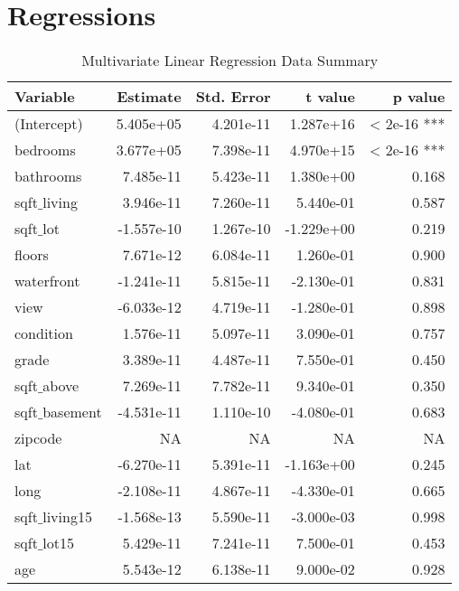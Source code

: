 \documentclass[a4paper, 8pt]{article}
\begin{document}
\section{Regressions}

\begin{table}[ht]
\centering
\begin{tabular}{|l|r|r|r|r|}
\hline
\textbf{Variable} & \textbf{Estimate} & \textbf{Std. Error} & \textbf{t value} & \textbf{p value} \\
\hline
(Intercept)       & 5.405e+05   & 4.201e-11  & 1.287e+16  & < 2e-16 ***  \\
bedrooms          & 3.677e+05   & 7.398e-11  & 4.970e+15  & < 2e-16 ***  \\
bathrooms         & 7.485e-11   & 5.423e-11  & 1.380e+00  & 0.168        \\
sqft$\_$living       & 3.946e-11   & 7.260e-11  & 5.440e-01  & 0.587        \\
sqft$\_$lot          & -1.557e-10  & 1.267e-10  & -1.229e+00 & 0.219        \\
floors            & 7.671e-12   & 6.084e-11  & 1.260e-01  & 0.900        \\
waterfront        & -1.241e-11  & 5.815e-11  & -2.130e-01 & 0.831        \\
view              & -6.033e-12  & 4.719e-11  & -1.280e-01 & 0.898        \\
condition         & 1.576e-11   & 5.097e-11  & 3.090e-01  & 0.757        \\
grade             & 3.389e-11   & 4.487e-11  & 7.550e-01  & 0.450        \\
sqft$\_$above        & 7.269e-11   & 7.782e-11  & 9.340e-01  & 0.350        \\
sqft$\_$basement     & -4.531e-11  & 1.110e-10  & -4.080e-01 & 0.683        \\
zipcode           & NA          & NA         & NA         & NA           \\
lat               & -6.270e-11  & 5.391e-11  & -1.163e+00 & 0.245        \\
long              & -2.108e-11  & 4.867e-11  & -4.330e-01 & 0.665        \\
sqft$\_$living15     & -1.568e-13  & 5.590e-11  & -3.000e-03 & 0.998        \\
sqft$\_$lot15        & 5.429e-11   & 7.241e-11  & 7.500e-01  & 0.453        \\
age               & 5.543e-12   & 6.138e-11  & 9.000e-02  & 0.928        \\
\hline
\end{tabular}
\caption{Multivariate Linear Regression Data Summary}
\label{mlrcoeffs}
\end{table}
\end{document}
